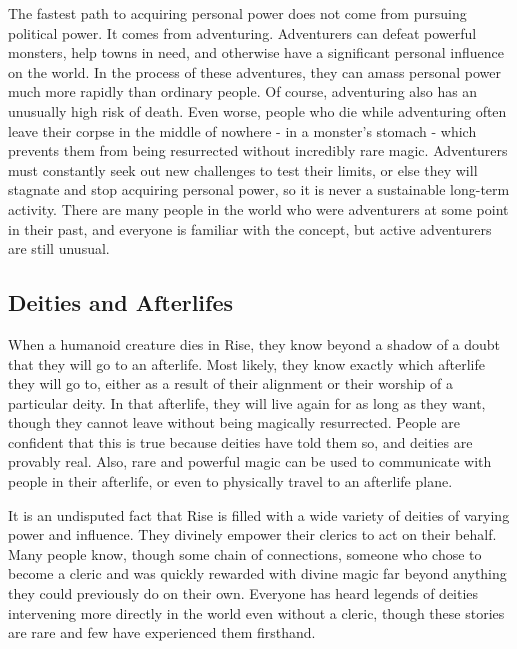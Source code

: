         The fastest path to acquiring personal power does not come from pursuing political power.
        It comes from adventuring.
        Adventurers can defeat powerful monsters, help towns in need, and otherwise have a significant personal influence on the world.
        In the process of these adventures, they can amass personal power much more rapidly than ordinary people.
        Of course, adventuring also has an unusually high risk of death.
        Even worse, people who die while adventuring often leave their corpse in the middle of nowhere - in a monster's stomach - which prevents them from being resurrected without incredibly rare magic.
        Adventurers must constantly seek out new challenges to test their limits, or else they will stagnate and stop acquiring personal power, so it is never a sustainable long-term activity.
        There are many people in the world who were adventurers at some point in their past, and everyone is familiar with the concept, but active adventurers are still unusual.

    \subsection{Deities and Afterlifes}\label{Deities and Afterlifes}
        When a humanoid creature dies in Rise, they know beyond a shadow of a doubt that they will go to an afterlife.
        Most likely, they know exactly which afterlife they will go to, either as a result of their alignment or their worship of a particular deity.
        In that afterlife, they will live again for as long as they want, though they cannot leave without being magically resurrected.
        People are confident that this is true because deities have told them so, and deities are provably real.
        Also, rare and powerful magic can be used to communicate with people in their afterlife, or even to physically travel to an afterlife plane.

        It is an undisputed fact that Rise is filled with a wide variety of deities of varying power and influence.
        They divinely empower their clerics to act on their behalf.
        Many people know, though some chain of connections, someone who chose to become a cleric and was quickly rewarded with divine magic far beyond anything they could previously do on their own.
        Everyone has heard legends of deities intervening more directly in the world even without a cleric, though these stories are rare and few have experienced them firsthand.

